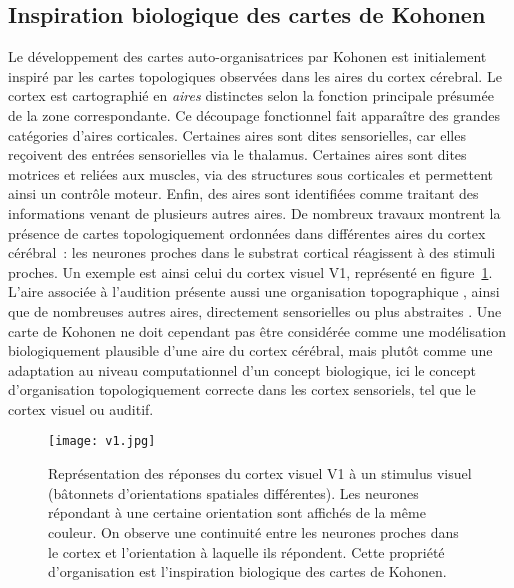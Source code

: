 \documentclass[../main]{subfiles}
\begin{document}
\subsection{Inspiration biologique des cartes de Kohonen}
Le développement des cartes auto-organisatrices par Kohonen est initialement inspiré par les cartes topologiques observées dans les aires du cortex cérebral. 
Le cortex est cartographié en \emph{aires} distinctes selon la fonction principale présumée de la zone correspondante.
Ce découpage fonctionnel fait apparaître des grandes catégories d'aires corticales. 
Certaines aires sont dites sensorielles, car elles reçoivent des entrées sensorielles via le thalamus. Certaines aires sont dites motrices et reliées aux muscles, via des structures sous corticales et permettent ainsi un contrôle moteur.
Enfin, des aires sont identifiées comme traitant des informations venant de plusieurs autres aires.
De nombreux travaux montrent la présence de cartes topologiquement ordonnées dans différentes aires du cortex cérébral~: les neurones proches dans le substrat cortical réagissent à des stimuli proches. 
Un exemple est ainsi celui du cortex visuel V1, représenté en figure~\ref{fig:v1}. 
L'aire associée à l'audition présente aussi une organisation topographique \cite{Reale1980TonotopicOI}, ainsi que de nombreuses autres aires, directement sensorielles ou plus abstraites \cite{Kohonen1995SelfOrganizingM}. 
Une carte de Kohonen ne doit cependant pas être considérée comme une modélisation biologiquement plausible d'une aire du cortex cérébral, mais plutôt comme une adaptation au niveau computationnel d'un concept biologique, ici le concept d'organisation topologiquement correcte dans les cortex sensoriels, tel que le cortex visuel ou auditif.

\begin{figure}
\centering
\texttt{[image: v1.jpg]}
\caption{Représentation des réponses du cortex visuel V1 à un stimulus visuel (bâtonnets d'orientations spatiales différentes). Les neurones répondant à une certaine orientation sont affichés de la même couleur. On observe une continuité entre les neurones proches dans le cortex et l'orientation à laquelle ils répondent. Cette propriété d'organisation est l'inspiration biologique des cartes de Kohonen.\label{fig:v1}}

\end{figure}
\end{document}
